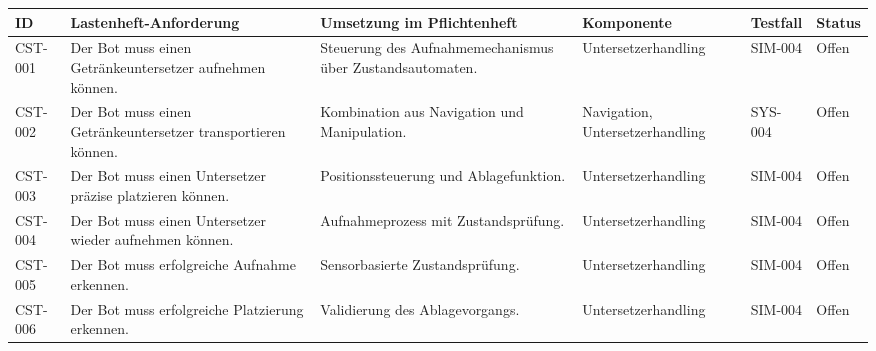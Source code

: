 \documentclass[
  a4paper,
  12pt,
  DIV=12,        %
  parskip=half,  %
  headings=small %
]{scrartcl}
\theoremstyle{definition}
\theoremstyle{definition}
\begin{document}
\begin{longtable}[]{@{}
  >{\raggedright\arraybackslash}p{}
  >{\raggedright\arraybackslash}p{}
  >{\raggedright\arraybackslash}p{}
  >{\raggedright\arraybackslash}p{}
  >{\raggedright\arraybackslash}p{}
  >{\raggedright\arraybackslash}p{}@{}}
\toprule\noalign{}
\begin{minipage}[b]{\linewidth}\raggedright
ID
\end{minipage} & \begin{minipage}[b]{\linewidth}\raggedright
Lastenheft-Anforderung
\end{minipage} & \begin{minipage}[b]{\linewidth}\raggedright
Umsetzung im Pflichtenheft
\end{minipage} & \begin{minipage}[b]{\linewidth}\raggedright
Komponente
\end{minipage} & \begin{minipage}[b]{\linewidth}\raggedright
Testfall
\end{minipage} & \begin{minipage}[b]{\linewidth}\raggedright
Status
\end{minipage} \\
\midrule\noalign{}
\endhead
\bottomrule\noalign{}
\endlastfoot
CST-001 & Der Bot muss einen Getränkeuntersetzer aufnehmen können. &
Steuerung des Aufnahmemechanismus über Zustandsautomaten. &
Untersetzerhandling & SIM-004 & Offen \\
CST-002 & Der Bot muss einen Getränkeuntersetzer transportieren können.
& Kombination aus Navigation und Manipulation. & Navigation,
Untersetzerhandling & SYS-004 & Offen \\
CST-003 & Der Bot muss einen Untersetzer präzise platzieren können. &
Positionssteuerung und Ablagefunktion. & Untersetzerhandling & SIM-004 &
Offen \\
CST-004 & Der Bot muss einen Untersetzer wieder aufnehmen können. &
Aufnahmeprozess mit Zustandsprüfung. & Untersetzerhandling & SIM-004 &
Offen \\
CST-005 & Der Bot muss erfolgreiche Aufnahme erkennen. & Sensorbasierte
Zustandsprüfung. & Untersetzerhandling & SIM-004 & Offen \\
CST-006 & Der Bot muss erfolgreiche Platzierung erkennen. & Validierung
des Ablagevorgangs. & Untersetzerhandling & SIM-004 & Offen \\
\end{longtable}
\end{document}
